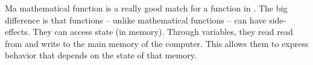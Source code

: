 Ma mathematical function is a really good match for a function in \csharp. The big difference is that \csharp functions -- unlike mathematical functions -- can have side-effects. They can access state (in memory). Through variables, they read read from and write to the main memory of the computer. This allows them to express behavior that depends on the state of that memory.
